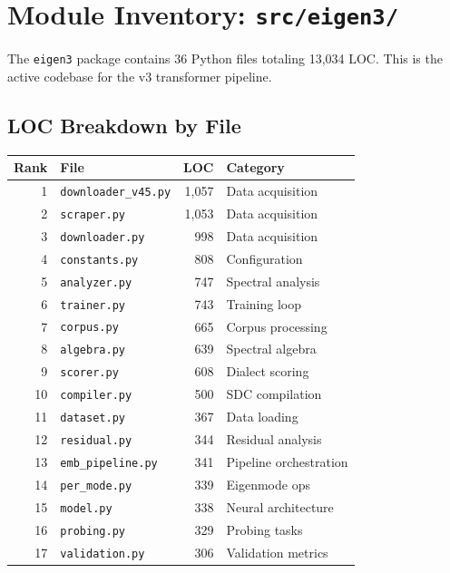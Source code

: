 \documentclass[11pt,a4paper]{article}
\begin{document}
\section{Module Inventory: \texttt{src/eigen3/}}

The \texttt{eigen3} package contains 36 Python files totaling 13{,}034 LOC. This is
the active codebase for the v3 transformer pipeline.

\subsection{LOC Breakdown by File}

\begin{longtable}{@{}rlrl@{}}
\toprule
\textbf{Rank} & \textbf{File} & \textbf{LOC} & \textbf{Category} \\
\midrule
\endhead
1 & \texttt{downloader\_v45.py} & 1{,}057 & Data acquisition \\
2 & \texttt{scraper.py} & 1{,}053 & Data acquisition \\
3 & \texttt{downloader.py} & 998 & Data acquisition \\
4 & \texttt{constants.py} & 808 & Configuration \\
5 & \texttt{analyzer.py} & 747 & Spectral analysis \\
6 & \texttt{trainer.py} & 743 & Training loop \\
7 & \texttt{corpus.py} & 665 & Corpus processing \\
8 & \texttt{algebra.py} & 639 & Spectral algebra \\
9 & \texttt{scorer.py} & 608 & Dialect scoring \\
10 & \texttt{compiler.py} & 500 & SDC compilation \\
11 & \texttt{dataset.py} & 367 & Data loading \\
12 & \texttt{residual.py} & 344 & Residual analysis \\
13 & \texttt{emb\_pipeline.py} & 341 & Pipeline orchestration \\
14 & \texttt{per\_mode.py} & 339 & Eigenmode ops \\
15 & \texttt{model.py} & 338 & Neural architecture \\
16 & \texttt{probing.py} & 329 & Probing tasks \\
17 & \texttt{validation.py} & 306 & Validation metrics \\

\end{longtable}
\end{document}
